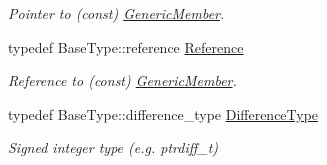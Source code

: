 \begin{DoxyCompactItemize}
\begin{DoxyCompactList}\small\item\em Pointer to (const) \hyperlink{struct_generic_member}{Generic\+Member}. \end{DoxyCompactList}\item 
typedef Base\+Type\+::reference \hyperlink{class_generic_member_iterator_ae80f6b601eb9e24f73aa75fb32b35c65}{Reference}\hypertarget{class_generic_member_iterator_ae80f6b601eb9e24f73aa75fb32b35c65}{}\label{class_generic_member_iterator_ae80f6b601eb9e24f73aa75fb32b35c65}

\begin{DoxyCompactList}\small\item\em Reference to (const) \hyperlink{struct_generic_member}{Generic\+Member}. \end{DoxyCompactList}\item 
typedef Base\+Type\+::difference\+\_\+type \hyperlink{class_generic_member_iterator_a902b99c8ae351cd7626514dc5f30740a}{Difference\+Type}\hypertarget{class_generic_member_iterator_a902b99c8ae351cd7626514dc5f30740a}{}\label{class_generic_member_iterator_a902b99c8ae351cd7626514dc5f30740a}

\begin{DoxyCompactList}\small\item\em Signed integer type (e.\+g. {\ttfamily ptrdiff\+\_\+t}) \end{DoxyCompactList}\end{DoxyCompactItemize}
